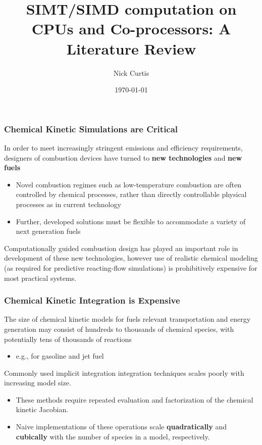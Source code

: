 \documentclass{beamer}
\title{SIMT\slash SIMD computation on CPUs and Co-processors: A Literature Review}
\author{Nick Curtis}
\institute{University of Connecticut}
\date{\today}
\begin{document}
\maketitle

\begin{frame}
\frametitle{Chemical Kinetic Simulations are \textbf{Critical}}
In order to meet increasingly stringent emissions and efficiency requirements, designers of combustion devices have turned to \textbf{new technologies} and \textbf{new fuels}
\begin{itemize}
 \item Novel combustion regimes such as low-temperature combustion are often controlled by chemical processes, rather than directly controllable physical processes as in current technology
 \item Further, developed solutions must be flexible to accommodate a variety of next generation fuels
\end{itemize}
Computationally guided combustion design has played an important role in development of these new technologies, however use of realistic chemical modeling (as required for predictive reacting-flow simulations) is prohibitively expensive for most practical systems. 
\end{frame}

\begin{frame}
 \frametitle{Chemical Kinetic Integration is \textbf{Expensive}}
 The size of chemical kinetic models for fuels relevant transportation and energy generation may consist of hundreds to thousands of chemical species, with potentially tens of thousands of reactions
 \begin{itemize}
  \item e.g., for gasoline  and jet fuel
 \end{itemize}
 Commonly used implicit integration integration techniques scales poorly with increasing model size.
 \begin{itemize}
  \item These methods require repeated evaluation and factorization of the chemical kinetic Jacobian.
  \item Naive implementations of these operations scale \textbf{quadratically} and \textbf{cubically} with the number of species in a model, respectively.
 \end{itemize}
\end{frame}
\end{document}
